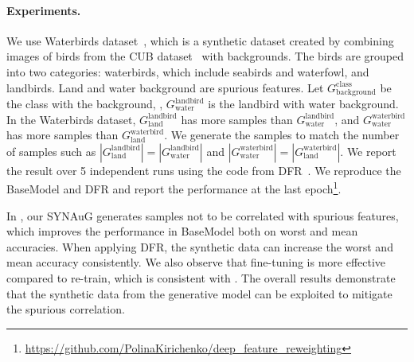 \paragraph{Experiments.} 
We use Waterbirds dataset~\cite{sagawa2019distributionally}, which is a synthetic dataset created by combining images of birds from the CUB dataset~\cite{WelinderEtal2010} with backgrounds.
The birds are grouped into two categories: waterbirds, which include seabirds and waterfowl, and landbirds.
Land and water background are spurious features.
Let $G_{\text{background}}^{\text{class}}$ be the class with the background, \eg, $G_{\text{water}}^{\text{landbird}}$ is the landbird with water background.
In the Waterbirds dataset, $G_{\text{land}}^{\text{landbird}}$ has more samples than $G_{\text{water}}^{\text{landbird}}$, and $G_{\text{water}}^{\text{waterbird}}$ has more samples than $G_{\text{land}}^{\text{waterbird}}$.
We generate the samples to match the number of samples such as $|G_{\text{land}}^{\text{landbird}}| = |G_{\text{water}}^{\text{landbird}}|$ and $|G_{\text{water}}^{\text{waterbird}}| = |G_{\text{land}}^{\text{waterbird}}|$.
We report the result over 5 independent runs using the code from DFR~\cite{kirichenko2023last}.
We reproduce the BaseModel and DFR and report the performance at the last epoch\footnote{\url{https://github.com/PolinaKirichenko/deep_feature_reweighting}}.

In , our SYNAuG generates samples not to be correlated with spurious features, which
improves the performance in BaseModel both on worst and mean accuracies.
When applying DFR, the synthetic data can increase the worst and mean accuracy consistently.
We also observe that fine-tuning is more effective 
compared to re-train, which is consistent with .
The overall results demonstrate that the synthetic data from the generative model can be exploited to mitigate the spurious correlation.


